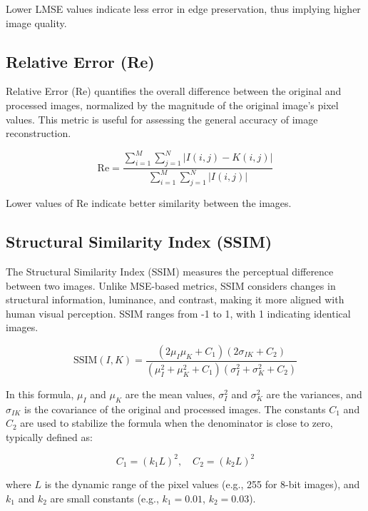 \documentclass[conference]{IEEEtran}
\begin{document}
Lower LMSE values indicate less error in edge preservation, thus implying higher image quality.

\subsection{Relative Error (Re)}
Relative Error (Re) quantifies the overall difference between the original and processed images, normalized by the magnitude of the original image's pixel values. This metric is useful for assessing the general accuracy of image reconstruction.

\begin{equation}
\text{Re} = \frac{\sum_{i=1}^{M} \sum_{j=1}^{N} |I(i,j) - K(i,j)|}{\sum_{i=1}^{M} \sum_{j=1}^{N} |I(i,j)|}
\end{equation}

Lower values of Re indicate better similarity between the images.

\subsection{Structural Similarity Index (SSIM)}
The Structural Similarity Index (SSIM) measures the perceptual difference between two images. Unlike MSE-based metrics, SSIM considers changes in structural information, luminance, and contrast, making it more aligned with human visual perception. SSIM ranges from -1 to 1, with 1 indicating identical images.

\begin{equation}
\text{SSIM}(I, K) = \frac{(2\mu_I \mu_K + C_1)(2\sigma_{IK} + C_2)}{(\mu_I^2 + \mu_K^2 + C_1)(\sigma_I^2 + \sigma_K^2 + C_2)}
\end{equation}

In this formula, \(\mu_I\) and \(\mu_K\) are the mean values, \(\sigma_I^2\) and \(\sigma_K^2\) are the variances, and \(\sigma_{IK}\) is the covariance of the original and processed images. The constants \(C_1\) and \(C_2\) are used to stabilize the formula when the denominator is close to zero, typically defined as:

\begin{equation}
C_1 = (k_1 L)^2, \quad C_2 = (k_2 L)^2
\end{equation}

where \(L\) is the dynamic range of the pixel values (e.g., 255 for 8-bit images), and \(k_1\) and \(k_2\) are small constants (e.g., \(k_1 = 0.01\), \(k_2 = 0.03\)).

\end{document}
